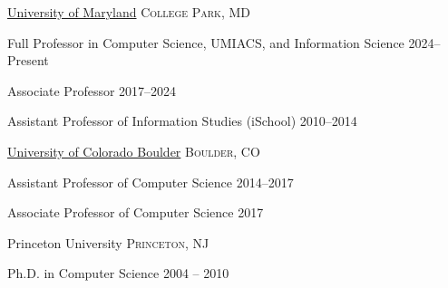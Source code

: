 \documentclass[10pt,a4paper]{article} %
\begin{document}




\headedsection %
{\href{http://umiacs.umd.edu}{University of Maryland}}
{\textsc{College Park, MD}} {

\headedsubsection %
{Full Professor in Computer Science, UMIACS, and Information Science}
{2024--Present}
{}


\headedsubsection %
{Associate Professor}
{2017--2024}
{}

\headedsubsection %
{Assistant Professor of Information Studies (iSchool)}
{2010--2014}
{}

}

\headedsection
{\href{http://cs.colorado.edu/}{University of Colorado Boulder}}
{\textsc{Boulder, CO}} {

\headedsubsection %
{Assistant Professor of Computer Science}
{2014--2017}
{}

\headedsubsection %
{Associate Professor of Computer Science}
{2017}
{}
}


\spacedhrule{-0.2em}{-0.4em} %



\headedsection %
{Princeton University}
{\textsc{Princeton, NJ}} {

\headedsubsection %
{Ph.D. in Computer Science}
{2004 -- 2010}
{}
}

\end{document}

